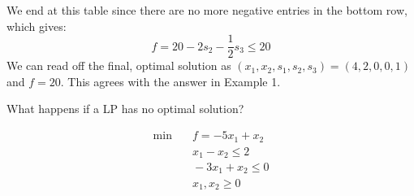 We end at this table since there are no more negative entries in the bottom row, which gives:
\begin{equation}
    f = 20-2s_2-\frac{1}{2}s_3\le 20
\end{equation}
We can read off the final, optimal solution as $(x_1, x_2, s_1, s_2, s_3) = (4, 2, 0, 0, 1)$ and $f=20$. This agrees with the answer in Example 1.

What happens if a LP has no optimal solution?

\begin{example}
    \begin{align*}
        \min&\quad f = -5x_1 + x_2 \\
        & \quad x_1 - x_2 \le 2\\
        & \quad -3x_1 + x_2 \le 0\\
        & \quad x_1, x_2 \ge 0
    \end{align*}
\end{example}
